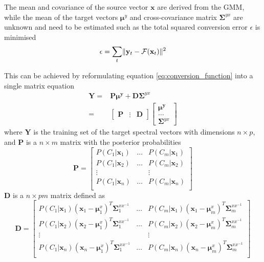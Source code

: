 The mean and covariance of the source vector $\mathbf{x}$ are derived from the GMM, while the mean of the target vectors $\boldsymbol{\mu}^y$ and cross-covariance matrix $\mathbf{\Sigma}^{yx}$ are unknown and need to be estimated such as the total squared conversion error $\epsilon$ is minimised
\begin{equation}
	\label{eq:conversion_error}
	\epsilon = \sum_{t} \lVert\mathbf{y}_t - \mathcal{F}(\mathbf{x}_t)\rVert^2
\end{equation}

This can be achieved by reformulating equation \eqref{eq:conversion_function} into a single matrix equation
\begin{equation}
	\label{eq:least_square_problem}
	\begin{split}
		\mathbf{Y} = &\mathbf{P}\boldsymbol{\mu^y} + \mathbf{D}\mathbf{\Sigma}^{yx} \\
		= & \begin{bmatrix}
			\mathbf{P}& \vdots &\mathbf{D}
		\end{bmatrix}
		\begin{bmatrix}
			\boldsymbol{\mu^y} \\
			\dots \\
			\mathbf{\Sigma}^{yx}
		\end{bmatrix}
	\end{split}
\end{equation}
where $\mathbf{Y}$ is the training set of the target spectral vectors with dimensions $n\times p$, and $\mathbf{P}$ is a $n \times m$ matrix with the posterior probabilities
\begin{equation}
	\label{eq:P_matrix}
	\mathbf{P} = \begin{bmatrix}
		P(C_1\vert \mathbf{x}_1) & \dots & P(C_m\vert \mathbf{x}_1) \\
		P(C_1\vert \mathbf{x}_2) & \dots & P(C_m\vert \mathbf{x}_2) \\
		\vdots & & \vdots \\
		P(C_1\vert \mathbf{x}_n) & \dots & P(C_m\vert \mathbf{x}_n) \\
	\end{bmatrix}
\end{equation}
$\mathbf{D}$ is a $n \times pm$ matrix defined as
\begin{equation}
	\label{eq:D_matrix}
	\mathbf{D} = \begin{bmatrix}
		P(C_1\vert \mathbf{x}_1)(\mathbf{x}_1 - \boldsymbol{\mu}_1^x)^T\mathbf{\Sigma}_1^{xx^{-1}} & \dots & P(C_m\vert \mathbf{x}_1)(\mathbf{x}_1 - \boldsymbol{\mu}_m^x)^T\mathbf{\Sigma}_m^{xx^{-1}} \\
		P(C_1\vert \mathbf{x}_2)(\mathbf{x}_2 - \boldsymbol{\mu}_1^x)^T\mathbf{\Sigma}_1^{xx^{-1}} & \dots & P(C_m\vert \mathbf{x}_2)(\mathbf{x}_2 - \boldsymbol{\mu}_m^x)^T\mathbf{\Sigma}_m^{xx^{-1}} \\
		\vdots & & \vdots \\
		P(C_1\vert \mathbf{x}_n)(\mathbf{x}_n - \boldsymbol{\mu}_1^x)^T\mathbf{\Sigma}_1^{xx^{-1}} & \dots & P(C_m\vert \mathbf{x}_n)(\mathbf{x}_n - \boldsymbol{\mu}_m^x)^T\mathbf{\Sigma}_m^{xx^{-1}} \\
	\end{bmatrix}
\end{equation}

